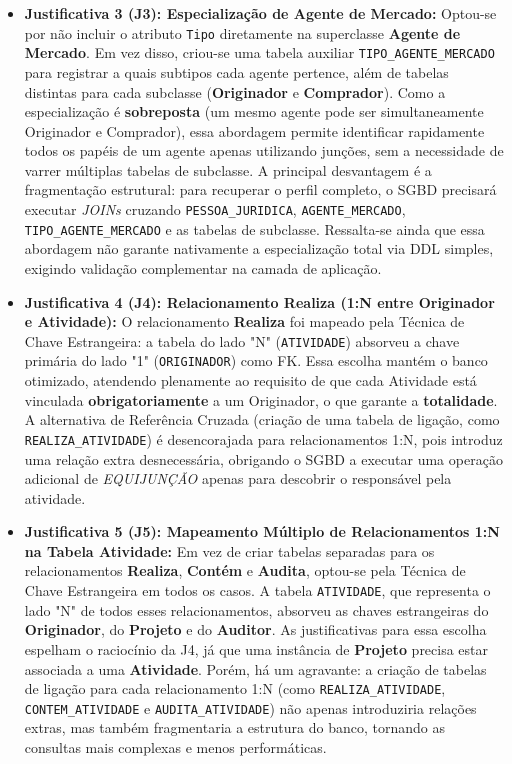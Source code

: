 \documentclass[12pt]{article}
\begin{document}
\begin{itemize}
    \item \textbf{Justificativa 3 (J3): Especialização de Agente de Mercado:}
    Optou-se por não incluir o atributo \texttt{Tipo} diretamente na superclasse \textbf{Agente de Mercado}. Em vez disso, criou-se uma tabela auxiliar \texttt{TIPO\_AGENTE\_MERCADO} para registrar a quais subtipos cada agente pertence, além de tabelas distintas para cada subclasse (\textbf{Originador} e \textbf{Comprador}). Como a especialização é \textbf{sobreposta} (um mesmo agente pode ser simultaneamente Originador e Comprador), essa abordagem permite identificar rapidamente todos os papéis de um agente apenas utilizando junções, sem a necessidade de varrer múltiplas tabelas de subclasse. A principal desvantagem é a fragmentação estrutural: para recuperar o perfil completo, o SGBD precisará executar \textit{JOINs} cruzando \texttt{PESSOA\_JURIDICA}, \texttt{AGENTE\_MERCADO}, \texttt{TIPO\_AGENTE\_MERCADO} e as tabelas de subclasse. Ressalta-se ainda que essa abordagem não garante nativamente a especialização total via DDL simples, exigindo validação complementar na camada de aplicação.
 
    \item \textbf{Justificativa 4 (J4): Relacionamento Realiza (1:N entre Originador e Atividade):}
    O relacionamento \textbf{Realiza} foi mapeado pela Técnica de Chave Estrangeira: a tabela do lado "N" (\texttt{ATIVIDADE}) absorveu a chave primária do lado "1" (\texttt{ORIGINADOR}) como FK. Essa escolha mantém o banco otimizado, atendendo plenamente ao requisito de que cada Atividade está vinculada \textbf{obrigatoriamente}  a um Originador, o que garante a \textbf{totalidade}. A alternativa de Referência Cruzada (criação de uma tabela de ligação, como \texttt{REALIZA\_ATIVIDADE}) é desencorajada para relacionamentos 1:N, pois introduz uma relação extra desnecessária, obrigando o SGBD a executar uma operação adicional de \textit{EQUIJUNÇÃO} apenas para descobrir o responsável pela atividade.
 
    \item \textbf{Justificativa 5 (J5): Mapeamento Múltiplo de Relacionamentos 1:N na Tabela Atividade:}
    Em vez de criar tabelas separadas para os relacionamentos \textbf{Realiza}, \textbf{Contém} e \textbf{Audita}, optou-se pela Técnica de Chave Estrangeira em todos os casos. A tabela \texttt{ATIVIDADE}, que representa o lado "N" de todos esses relacionamentos, absorveu as chaves estrangeiras do \textbf{Originador}, do \textbf{Projeto} e do \textbf{Auditor}. As justificativas para essa escolha espelham o raciocínio da J4, já que uma instância de \textbf{Projeto} precisa estar associada a uma \textbf{Atividade}. Porém, há um agravante: a criação de tabelas de ligação para cada relacionamento 1:N (como \texttt{REALIZA\_ATIVIDADE}, \texttt{CONTEM\_ATIVIDADE} e \texttt{AUDITA\_ATIVIDADE}) não apenas introduziria relações extras, mas também fragmentaria a estrutura do banco, tornando as consultas mais complexas e menos performáticas.
 

\end{itemize}
\end{document}
